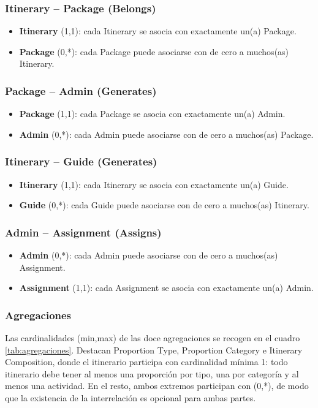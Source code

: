 \documentclass[11pt,a4paper]{article}
\begin{document}
\subsubsection{Itinerary – Package (Belongs)}
\begin{itemize}[leftmargin=1.2em,itemsep=2pt,topsep=3pt]
\item \textbf{Itinerary} (1,1): cada Itinerary se asocia con exactamente un(a) Package.
\item \textbf{Package} (0,*): cada Package puede asociarse con de cero a muchos(as) Itinerary.
\end{itemize}
\subsubsection{Package – Admin (Generates)}
\begin{itemize}[leftmargin=1.2em,itemsep=2pt,topsep=3pt]
\item \textbf{Package} (1,1): cada Package se asocia con exactamente un(a) Admin.
\item \textbf{Admin} (0,*): cada Admin puede asociarse con de cero a muchos(as) Package.
\end{itemize}
\subsubsection{Itinerary – Guide (Generates)}
\begin{itemize}[leftmargin=1.2em,itemsep=2pt,topsep=3pt]
\item \textbf{Itinerary} (1,1): cada Itinerary se asocia con exactamente un(a) Guide.
\item \textbf{Guide} (0,*): cada Guide puede asociarse con de cero a muchos(as) Itinerary.
\end{itemize}
\subsubsection{Admin – Assignment (Assigns)}
\begin{itemize}[leftmargin=1.2em,itemsep=2pt,topsep=3pt]
\item \textbf{Admin} (0,*): cada Admin puede asociarse con de cero a muchos(as) Assignment.
\item \textbf{Assignment} (1,1): cada Assignment se asocia con exactamente un(a) Admin.
\end{itemize}
\subsubsection{Agregaciones}
Las cardinalidades (min,max) de las doce agregaciones se recogen en el cuadro \ref{tab:agregaciones}. Destacan Proportion Type, Proportion Category e Itinerary Composition, donde el itinerario participa con cardinalidad mínima 1: todo itinerario debe tener al menos una proporción por tipo, una por categoría y al menos una actividad. En el resto, ambos extremos participan con (0,*), de modo que la existencia de la interrelación es opcional para ambas partes.
\end{document}
